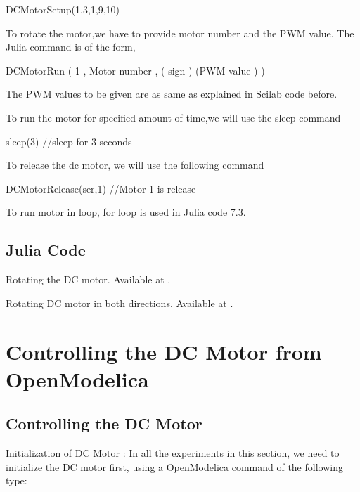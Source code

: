 DCMotorSetup(1,3,1,9,10)

To rotate the motor,we have to provide motor number
and the PWM value. The Julia command is of the form,

DCMotorRun ( 1 , Motor number , ( sign ) (PWM value ) )

The PWM values to be given are as same as explained in Scilab code before.

To run the motor for specified amount of time,we will use the sleep command

sleep(3) //sleep for 3 seconds

To release the dc motor, we will use the following command

DCMotorRelease(ser,1) //Motor 1 is release

To run motor in loop, for loop is used in Julia code 7.3.

\subsection{Julia Code}
\label{sec:dcmotor-julia-code}

\begin{juliacode}
{Rotating the DC motor.  Available at
  .}
\label{julia:dcmotor-clock}

\end{juliacode}

\begin{juliacode}
{Rotating DC motor in both directions.  Available at
  .}
\label{julia:dcmotor-both}

\end{juliacode}

\begin{juliacode}
\label{julia:dcmotor-loop}

\end{juliacode}


\section{Controlling the DC Motor from OpenModelica}
\subsection{Controlling the DC Motor}
Initialization of DC Motor : In all the experiments in this section,
we need to initialize the DC motor first, using a OpenModelica command
of the following type:

